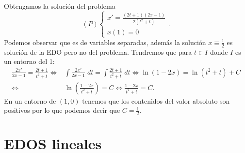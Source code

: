 \begin{eg}
Obtengamos la solución del problema
\[\left(P\right)
\begin{cases}
x' = \frac{\left(2t+1\right)\left(2x-1\right)}{2\left(t ^{2} + t\right)} \\
x\left(1\right) = 0
\end{cases}
.\]
Podemos observar que es de variables separadas, además la solución $\displaystyle x \equiv \frac{1}{2} $ es solución de la EDO pero no del problema. Tendremos que para $\displaystyle t \in I $ donde $\displaystyle I $ es un entorno del 1:
\[
\begin{split}
	\frac{2x'}{2x-1} = \frac{2t+1}{t ^{2} + t} \iff & \int \frac{2x'}{2x-1} \; dt = \int \frac{2t+1}{t ^{2}+t} \; dt \iff \ln (1-2x)= \ln (t ^{2}+t)+ C \\
	\iff & \ln \left(\frac{1-2x}{t ^{2}+t}\right) = C \iff  \frac{1-2x}{t^{2}+t}=C.
\end{split}
\]
En un entorno de $\displaystyle \left(1,0\right) $ tenemos que los contenidos del valor absoluto son positivos por lo que podemos decir que $\displaystyle C = \frac{1}{2} $. 
\end{eg}
\section{EDOS lineales}

